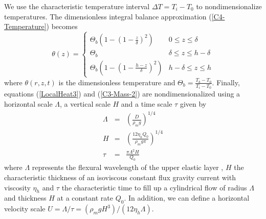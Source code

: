 We use the characteristic temperature interval $\Delta T = T_i-T_0$ to
nondimensionalize temperatures.  The dimensionless integral balance
approximation (\ref{C4-Temperature}) becomes
\begin{equation}
  \theta(z)=
  \begin{cases}
    \Theta_b\left(1 -(1-\frac{z}{\delta})^2\right)& 0 \le z\le \delta \\
    \Theta_b & \delta \le z\le h-\delta \\
    \Theta_b\left(1-(1-\frac{h-z}{\delta})^2\right)  &   h-\delta  \le
    z\le h
  \end{cases}
  \label{Temperature2}
\end{equation}
where   $\theta(r,z,t)$   is   the   dimensionless   temperature   and
$\Theta_b=\frac{T_b-T_0}{T_{i}-T_0}$.        Finally,        equations
(\ref{LocalHeat3}) and (\ref{C3-Mass-2})  are nondimensionalized using
a horizontal  scale $\Lambda$, a vertical  scale $H$ and a  time scale
$\tau$ given by
\begin{eqnarray}
  \Lambda &=& \left(\frac{D}{\rho_m g}\right)^{1/4}\label{L1}\\
  H&=&\left       (\frac{12\eta_h      Q_{0}}{\rho_{m}g       \pi}\right      )
       ^{1/4} \label{H1}\\
  \tau&=&\frac{\pi \Lambda^{2} H}{Q_{0}}\label{T1}
\end{eqnarray}
where  $\Lambda$  represents  the  flexural wavelength  of  the  upper
elastic layer \citep{Michaut:2011kg}, $H$ the characteristic thickness
of an isoviscous constant flux gravity current with viscosity $\eta_h$
\citep{Huppert:1982wr} and $\tau$ the characteristic time to fill up a
cylindrical flow of  radius $\Lambda$ and thickness $H$  at a constant
rate $Q_0$.   In addition, we  can define a horizontal  velocity scale
$U=\Lambda/\tau=\left(\rho_m           g           H^3\right)/\left(12
  \eta_h\Lambda\right)$.

